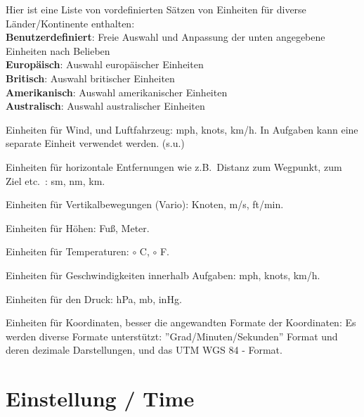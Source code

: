 \begin{description}\itemsep
\item[Vorauswahl] Hier ist eine Liste von vordefinierten Sätzen von Einheiten für diverse Länder/Kontinente enthalten:\\
{\bf Benutzerdefiniert}: Freie Auswahl und Anpassung der unten angegebene Einheiten nach Belieben\\
{\bf Europäisch}: Auswahl europäischer Einheiten   \\
{\bf Britisch}:   Auswahl britischer  Einheiten\\
{\bf Amerikanisch}:   Auswahl amerikanischer Einheiten\\
{\bf Australisch}:   Auswahl australischer Einheiten
\item[Luftfahrzeug-/Windgeschwindigkeit\textcolor{blue}{$\star$}]  Einheiten für Wind, und Luftfahrzeug: mph, knots, km/h.
    In Aufgaben kann eine separate Einheit verwendet werden. (s.u.)
\item[Entfernungen$^{\textcolor{blue}{\star}}$] Einheiten für horizontale Entfernungen wie z.B.\  Distanz zum Wegpunkt, zum Ziel
    etc.\ : sm, nm, km.
\item[Steigen/Sinken$^{\textcolor{blue}{\star}}$] Einheiten für Vertikalbewegungen (Vario): Knoten,  m/s, ft/min.
\item[Höhen$^{\textcolor{blue}{\star}}$] Einheiten für Höhen: Fuß, Meter.
\item[Temperaturen$^{\textcolor{blue}{\star}}$] Einheiten für Temperaturen: $\circ$ C, $\circ$ F.
\item[Aufgaben-Geschwindigkeiten$^{\textcolor{blue}{\star}}$] Einheiten für Geschwindigkeiten innerhalb Aufgaben: mph, knots,
    km/h.
\item[Druck$^{\textcolor{blue}{\star}}$]  Einheiten für den Druck: hPa, mb, inHg.
\item[Geographische Länge und Breite$^{\textcolor{blue}{\star}}$]  Einheiten für Koordinaten, besser die angewandten Formate
    der Koordinaten:  Es werden diverse Formate unterstützt:  ''Grad/Minuten/Sekunden'' Format und
    deren dezimale Darstellungen,  und das UTM WGS 84 - Format.
\end{description}


\section{Einstellung / Time}\label{sec:time-justage}

